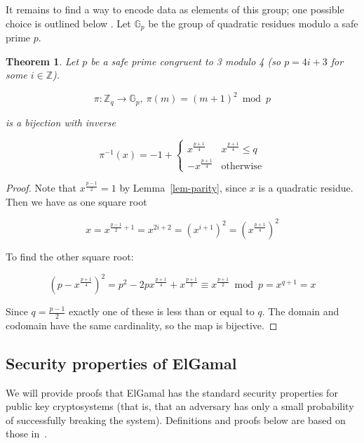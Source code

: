 \documentclass[11pt,twoside,a4paper]{article}
\newtheorem{theorem}{Theorem}[section]
\theoremstyle{definition}
\begin{document}
It remains to find a way to encode data as elements of this group; one possible choice is outlined below \cite{katz2014introduction}. Let $\mathbb{G}_p$ be the group of quadratic residues modulo a safe prime $p$.
\begin{theorem}
    Let $p$ be a safe prime congruent to 3 modulo 4 (so $p=4i+3$ for some $i\in\mathbb{Z}$).

    $$\pi:\mathbb{Z}_q\rightarrow\mathbb{G}_p,\ \pi(m)=(m+1)^2\bmod p$$

    is a bijection with inverse

    $$\pi^{-1}(x)=-1+\begin{cases}
        x^\frac{p+1}{4} & x^\frac{p+1}{4}\leq q\\
        -x^\frac{p+1}{4}&\text{otherwise}
    \end{cases}$$

\end{theorem}
\begin{proof}
    Note that $x^\frac{p-1}{2}=1$ by Lemma~\ref{lem-parity}, since $x$ is a quadratic residue. Then we have as one square root

    $$x=x^{\frac{p-1}{2}+1}=x^{2i+2}=(x^{i+1})^2=\left(x^\frac{p+1}{4}\right)^2$$

    To find the other square root:

    $$\left(p-x^\frac{p+1}{4}\right)^2=p^2-2px^\frac{p+1}{4}+x^\frac{p+1}{2}\equiv x^\frac{p+1}{2}\bmod p=x^{q+1}=x$$

    Since $q=\frac{p-1}{2}$ exactly one of these is less than or equal to $q$. The domain and codomain have the same cardinality, so the map is bijective.



\end{proof}
\subsection{Security properties of ElGamal}
We will provide proofs that ElGamal has the standard security properties for public key cryptosystems (that is, that an adversary has only a small probability of successfully breaking the system). Definitions and proofs below are based on those in~\cite{katz2014introduction}.
\end{document}
